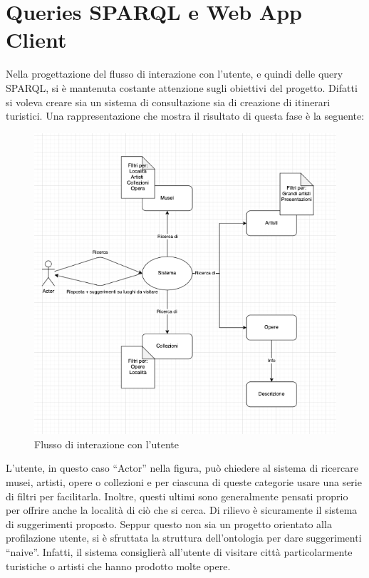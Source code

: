 \documentclass[12pt]{article}
\begin{document}
\section{Queries SPARQL e Web App Client}
Nella progettazione del flusso di interazione con l’utente, e quindi delle query SPARQL, si è mantenuta costante attenzione sugli obiettivi del progetto. Difatti si voleva creare sia un sistema di consultazione sia di creazione di itinerari turistici. 
Una rappresentazione che mostra il risultato di questa fase è la seguente:
\begin{figure}[!h]
   \centering
   \includegraphics[scale=0.6]{fig/flowchart interazione.png}
   \caption{Flusso di interazione con l'utente}\label{fig:picture}
\end{figure}

L’utente, in questo caso “Actor” nella figura, può chiedere al sistema di ricercare musei, artisti, opere o collezioni e per ciascuna di queste categorie usare una serie di filtri per facilitarla. Inoltre, questi ultimi sono generalmente pensati proprio per offrire anche la località di ciò che si cerca. Di rilievo è sicuramente il sistema di suggerimenti proposto. Seppur questo non sia un progetto orientato alla profilazione utente, si è sfruttata la struttura dell’ontologia per dare suggerimenti “naive”. Infatti, il sistema consiglierà all’utente di visitare città particolarmente turistiche o artisti che hanno prodotto molte opere.
\end{document}
